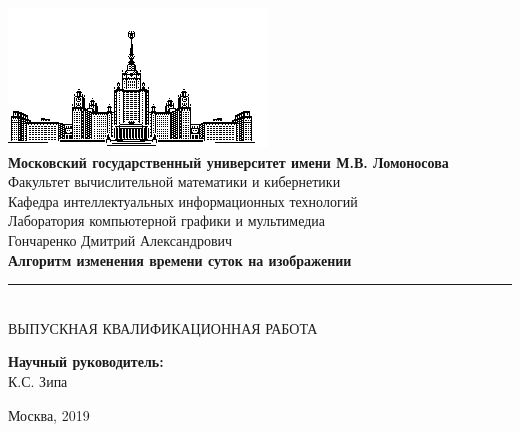 \documentclass[11pt,a4paper]{extarticle}
\begin{document}
\begin{titlepage}
	\begin{centering}
		\includegraphics{img/msu}\\
		\large{
			\textbf{Московский государственный университет имени М.В. Ломоносова}\\
			Факультет вычислительной математики и кибернетики\\
			Кафедра интеллектуальных информационных технологий\\
			Лаборатория компьютерной графики и мультимедиа\\[4cm]
		}
		\Large{
			Гончаренко Дмитрий Александрович\\[0.9cm]
		}
		\Large{
			\textbf{Алгоритм изменения времени суток на изображении}\\
		}
		\rule[0.3cm]{14cm}{0.02cm}\\[1cm]
		\large{
			ВЫПУСКНАЯ КВАЛИФИКАЦИОННАЯ РАБОТА\\[4cm]
		}
	\end{centering}
	\begin{flushright}
		\large{
			\textbf{Научный руководитель:}\\ К.С. Зипа\\
		}
	\end{flushright}
	\begin{center}
		\vfill
		\large{
			Москва, 2019
		}
	\end{center}
\end{titlepage}
\end{document}
